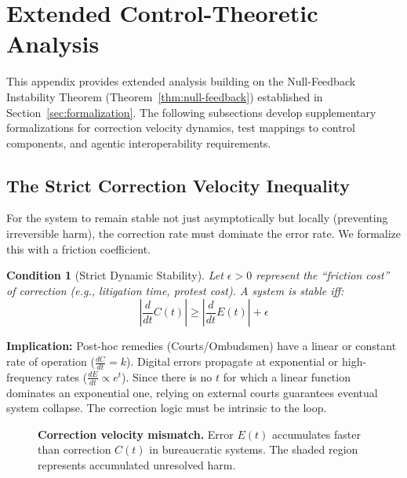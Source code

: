 \documentclass{article}
\newtheorem{condition}{Condition}
\begin{document}
\section{Extended Control-Theoretic Analysis}
\label{appendix:proofs}

This appendix provides extended analysis building on the Null-Feedback Instability Theorem (Theorem~\ref{thm:null-feedback}) established in Section~\ref{sec:formalization}. The following subsections develop supplementary formalizations for correction velocity dynamics, test mappings to control components, and agentic interoperability requirements.

\subsection{The Strict Correction Velocity Inequality}

For the system to remain stable not just asymptotically but locally (preventing irreversible harm), the correction rate must dominate the error rate. We formalize this with a friction coefficient.

\begin{condition}[Strict Dynamic Stability]
\label{cond:friction}
Let $\epsilon > 0$ represent the ``friction cost'' of correction (e.g., litigation time, protest cost). A system is stable iff:
\begin{equation}
\left| \frac{d}{dt} C(t) \right| \ge \left| \frac{d}{dt} E(t) \right| + \epsilon
\end{equation}
\end{condition}

\textbf{Implication:} Post-hoc remedies (Courts/Ombudsmen) have a linear or constant rate of operation ($\frac{dC}{dt} = k$). Digital errors propagate at exponential or high-frequency rates ($\frac{dE}{dt} \propto e^{t}$). Since there is no $t$ for which a linear function dominates an exponential one, relying on external courts guarantees eventual system collapse. The correction logic must be intrinsic to the loop.

\begin{figure}[htbp]
\centering
{}
\caption{\textbf{Correction velocity mismatch.} Error $E(t)$ accumulates faster than correction $C(t)$ in bureaucratic systems. The shaded region represents accumulated unresolved harm.}
\label{fig:velocity-mismatch}
\end{figure}
\end{document}
